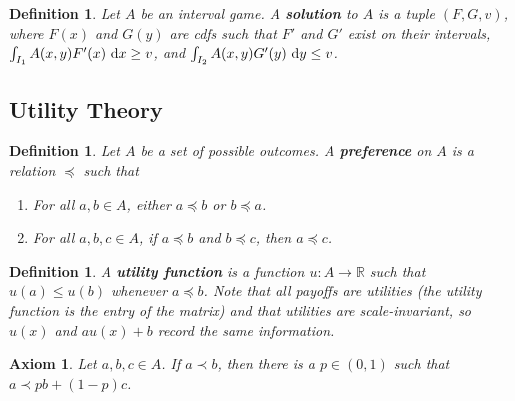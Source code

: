 \documentclass{article}
\theoremstyle{colontheorem}
\newtheorem{definition}[theorem]{Definition}
\newtheorem{axiom}[theorem]{Axiom}
\newenvironment{Def}
{
	\begin{mdframed}[backgroundcolor=DefGreen!10]
	\begin{definition}
}
{
	\end{definition}
	\end{mdframed}
	
	\vspace{.15in}
}
\newenvironment{Axiom}
{
	\begin{mdframed}[backgroundcolor=AxiomRed!10]
	\begin{axiom}
}
{
	\end{axiom}
	\end{mdframed}
	
	\vspace{.15in}
}
\begin{document}
\begin{Def}
	
	Let $A$ be an interval game. A \textbf{solution} to $A$ is a tuple $(F, G, v)$, where $F(x)$ and $G(y)$ are cdfs such that $F'$ and $G'$ exist on their intervals, $\int_{I_1} A(x, y) F'(x)\ \textnormal{d}x \geq v$, and $\int_{I_2} A(x, y) G'(y)\ \textnormal{d}y \leq v$.
	
\end{Def}





\begin{center}
	\pagebreak
	
	\section{Utility Theory}
	
	\vspace{.1in}
\end{center}



\begin{Def}
	
	Let $A$ be a set of possible outcomes. A \textbf{preference} on $A$ is a relation $\preceq$ such that
	
	\begin{enumerate}
		
		\item For all $a, b \in A$, either $a \preceq b$ or $b \preceq a$.
		
		\item For all $a, b, c \in A$, if $a \preceq b$ and $b \preceq c$, then $a \preceq c$.
		
	\end{enumerate}
	
\end{Def}



\begin{Def}
	
	A \textbf{utility function} is a function $u : A \longrightarrow \mathbb{R}$ such that $u(a) \leq u(b)$ whenever $a \preceq b$. Note that all payoffs are utilities (the utility function is the entry of the matrix) and that utilities are scale-invariant, so $u(x)$ and $au(x) + b$ record the same information.
	
\end{Def}



\begin{Axiom}
	
	Let $a, b, c \in A$. If $a \prec b$, then there is a $p \in (0,1)$ such that $a \prec pb + (1-p)c$.
	
\end{Axiom}
\end{document}
